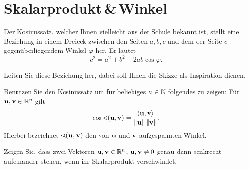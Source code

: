 \documentclass{scrartcl}
\newcommand{\uu}{\mat u}
\newcommand{\vv}{\mat v}
\begin{document}
\section{Skalarprodukt\,\&\,Winkel }
Der Kosinussatz, welcher Ihnen vielleicht aus der Schule bekannt ist, stellt eine Beziehung in einem Dreieck zwischen den Seiten $a,b,c$ und dem der Seite $c$ gegenüberliegendem Winkel $\varphi$ her.
Er lautet
  \[
  c^2=a^2+b^2-2ab\cos \varphi.
  \]
\begin{subex}
  \item{} Leiten Sie diese Beziehung her, dabei soll Ihnen die Skizze als Inspiration dienen.
  \item{} Benutzen Sie den Kosinussatz um für beliebiges $n \in \mathbb{N}$ folgendes zu zeigen: Für $\uu, \vv \in \RR^n$ gilt
  \[
    \cos \sphericalangle(\uu,\vv) = \frac{\sp{\uu}{\vv}}{\norm{\uu}\norm{\vv}}.
  \]
  Hierbei bezeichnet $\sphericalangle(\uu,\vv)$ den von $\uu$ und $\vv$ aufgespannten Winkel.
  \item{} Zeigen Sie, dass zwei Vektoren $\uu, \vv \in \RR^n$, $\uu, \vv \neq 0$ genau dann senkrecht aufeinander stehen, wenn ihr Skalarprodukt verschwindet.
\end{subex}


\vspace{1em}
\begin{center}
\end{center}
\end{document}
